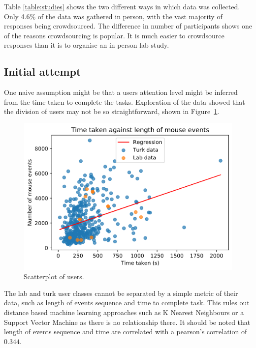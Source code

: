 \documentclass{article}
\begin{document}
Table \ref{table:studies} shows the two different ways in which data was collected.
Only 4.6\% of the data was gathered in person, with the vast majority of responses being crowdsourced.
The difference in number of participants shows one of the reasons crowdsourcing is popular. 
It is much easier to crowdsource responses than it is to organise an in person lab study.


\subsection{Initial attempt}

One naive assumption might be that a users attention level might be inferred from the time taken to complete the tasks.
Exploration of the data showed that the division of users may not be so straightforward, shown in Figure~\ref{fig:scatterplot}.

\begin{figure}[ht]
    \centering
    \includegraphics[scale=0.6]{Images/TimeTaken-Mouse-Events.png}
    \caption{Scatterplot of users.}
    \label{fig:scatterplot}
\end{figure}

The lab and turk user classes cannot be separated by a simple metric of their data, such as length of events sequence and time to complete task.
This rules out distance based machine learning approaches such as K Nearest Neighbours or a Support Vector Machine as there is no relationship there.
It should be noted that length of events sequence and time are correlated with a pearson's correlation of $0.344$.
\end{document}
